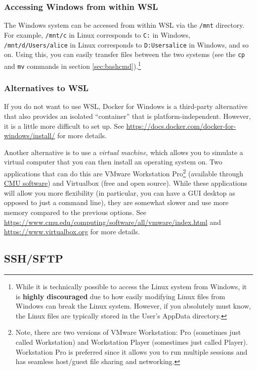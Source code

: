 \documentclass[12pt]{article}
\begin{document}
\subsubsection{Accessing Windows from within WSL}
The Windows system can be accessed from within WSL via the \texttt{/mnt} directory. For example, \texttt{/mnt/c} in Linux corresponds to \texttt{C:} in Windows, \texttt{/mnt/d/Users/alice} in Linux corresponds to \texttt{D:Usersalice} in Windows, and so on. Using this, you can easily transfer files between the two systems (see the \texttt{cp} and \texttt{mv} commands in section \ref{sec:bashcmd}).\footnote{While it is technically possible to access the Linux system from Windows, it is \textbf{highly discouraged} due to how easily modifying Linux files from Windows can break the Linux system. However, if you absolutely must know, the Linux files are typically stored in the User's AppData directory.}

\subsubsection{Alternatives to WSL}
If you do not want to use WSL, Docker for Windows is a third-party alternative that also provides an isolated ``container'' that is platform-independent. However, it is a little more difficult to set up. See \url{https://docs.docker.com/docker-for-windows/install/} for more details.

Another alternative is to use a \emph{virtual machine}, which allows you to simulate a virtual computer that you can then install an operating system on. Two applications that can do this are VMware Workstation Pro\footnote{Note, there are two versions of VMware Workstation: Pro (sometimes just called Workstation) and Workstation Player (somestimes just called Player). Workstation Pro is preferred since it allows you to run multiple sessions and has seamless host/guest file sharing and networking.} (available through \href{https://www.cmu.edu/computing/software}{CMU software}) and Virtualbox (free and open source). While these applications will allow you more flexibility (in particular, you can have a GUI desktop as opposed to just a command line), they are somewhat slower and use more memory compared to the previous options. See \url{https://www.cmu.edu/computing/software/all/vmware/index.html} and \url{https://www.virtualbox.org} for more details.



\subsection{SSH/SFTP}
\end{document}
